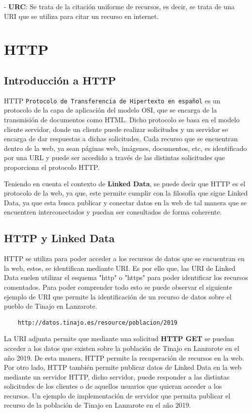 \documentclass[11pt]{report}
\begin{document}
- \textbf{URC}: Se trata de la citación uniforme de recursos, es decir, se trata de una URI que se utiliza para citar un recurso en internet.

\chapter{HTTP}

\section{Introducción a HTTP}

HTTP \texttt{Protocolo de Transferencia de Hipertexto en español} es un protocolo de la capa de aplicación del modelo OSI, que se encarga de la transmisión de documentos como HTML.  Dicho protocolo se basa en el modelo cliente servidor, donde un cliente puede realizar solicitudes y un servidor se encarga de dar respuestas a dichas solicitudes. Cada recurso que se encuentran dentro de la web, ya sean páginas web, imágenes, documentos, etc, es identificado por una URL y puede ser accedido a través de las distintas solicitudes que proporciona el protocolo HTTP.

Teniendo en cuenta el contexto de \textbf{Linked Data}, se puede decir que HTTP es el protocolo de la web, ya que, este permite cumplir con la filosofía que sigue Linked Data, ya que esta busca publicar y conectar datos en la web de tal manera que se encuentren interconectados y puedan ser consultados de forma coherente.

\section{HTTP y Linked Data}

HTTP se utiliza para poder acceder a los recursos de datos que se encuentran en la web, estos, se identifican mediante URI. Es por ello que, las URI de Linked Data suelen utilizar el esquema "http" o "https" para poder identificar los recursos comentados. Para poder comprender todo esto se puede observar el siguiente ejemplo de URI que permite la identificación de un recurso de datos sobre el pueblo de Tinajo en Lanzarote.

\begin{verbatim}
	http://datos.tinajo.es/resource/poblacion/2019
\end{verbatim}

La URI adjunta permite que mediante una solicitud \textbf{HTTP GET} se puedan acceder a los datos que existen sobre la población de Tinajo en Lanzarote en el año 2019. De esta manera, HTTP permite la recuperación de recursos en la web. Por otro lado, HTTP también permite publicar datos de Linked Data en la web mediante un servidor HTTP, dicho servidor, puede responder a las distintas solicitudes de los clientes o de aquellos usuarios que quieran acceder a los recursos. Un ejemplo de implementación de servidor que permita publicar el recurso de la población de Tinajo en Lanzarote en el año 2019.
\end{document}
